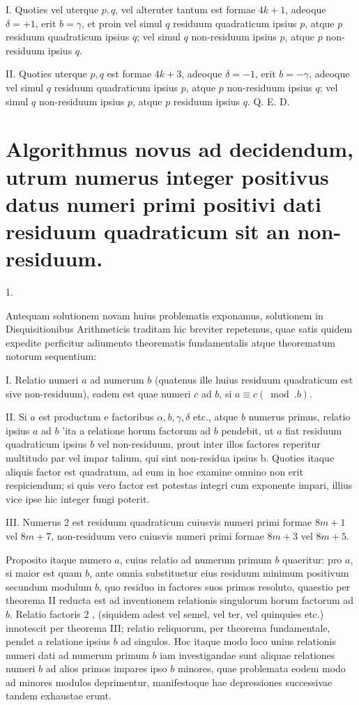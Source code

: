 \documentclass[10pt]{article}
\begin{document}
I. Quoties vel uterque \(p, q\), vel alteruter tantum est formae \(4 k+1\), adeoque \(\delta=+1\), erit \(b=\gamma\), et proin vel simul \(q\) residuum quadraticum ipsius \(p\), atque \(p\) residuum quadraticum ipsius \(q\); vel simul \(q\) non-residuum ipsius \(p\), atque \(p\) non-residuum ipsius \(q\).

II. Quoties uterque \(p, q\) est formae \(4 k+3\), adeoque \(\delta=-1\), erit \(b=-\gamma\), adeoque vel simul \(q\) residuum quadraticum ipsius \(p\), atque \(p\) non-residuum ipsius \(q\); vel simul \(q\) non-residuum ipsius \(p\), atque \(p\) residuum ipsius \(q\). Q. E. D.

\section*{Algorithmus novus ad decidendum, utrum numerus integer positivus datus numeri primi positivi dati residuum quadraticum sit an non-residuum.}
1.

Antequam solutionem novam huius problematis exponamus, solutionem in Disquisitionibus Arithmeticis traditam hic breviter repetemus, quae satis quidem expedite perficitur adiumento theorematis fundamentalis atque theorematum notorum sequentium:

I. Relatio numeri \(a\) ad numerum \(b\) (quatenus ille huius residuum quadraticum est sive non-residuum), eadem est quae numeri \(c\) ad \(b\), si \(a \equiv c(\bmod . b)\).

II. Si \(a\) est productum e factoribus \(\alpha, b, \gamma, \delta\) etc., atque \(b\) numerus primus, relatio ipsius \(a\) ad \(b\) 'ita a relatione horum factorum ad \(b\) pendebit, ut \(a\) fiat residuum quadraticum ipsius \(b\) vel non-residuum, prout inter illos factores reperitur multitudo par vel impar talium, qui sint non-residua ipsius b. Quoties itaque aliquis factor est quadratum, ad eum in hoc examine omnino non erit respiciendum; si quis vero factor est potestas integri cum exponente impari, illius vice ipse hic integer fungi poterit.

III. Numerus 2 est residuum quadraticum cuiusvis numeri primi formae \(8 m+1\) vel \(8 m+7\), non-residuum vero cuiusvis numeri primi formae \(8 m+3\) vel \(8 m+5\).

Proposito itaque numero \(a\), cuius relatio ad numerum primum \(b\) quaeritur: pro \(a\), si maior est quam \(b\), ante omnia substituetur eius residuum minimum positivum secundum modulum \(b\), quo residuo in factores suos primos resoluto, quaestio per theorema II reducta est ad inventionem relationis singulorum horum factorum ad \(b\). Relatio factoris 2 , (siquidem adest vel semel, vel ter, vel quinquies etc.) innotescit per theorema III; relatio reliquorum, per theorema fundamentale, pendet a relatione ipsius \(b\) ad singulos. Hoc itaque modo loco unius relationis numeri dati ad numerum primum \(b\) iam investigandae sunt aliquae relationes numeri \(b\) ad alios primos impares ipso \(b\) minores, quae problemata eodem modo ad minores modulos deprimentur, manifestoque hae depressiones successivae tandem exhaustae erunt.
\end{document}
